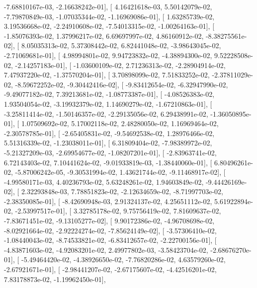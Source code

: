 \documentclass{article}
\begin{document}
         -7.68810167e-03,  -2.16638242e-01],
       [  4.16421618e-03,   5.50142079e-02,  -7.79870849e-03,
         -1.07035344e-02,  -1.16969086e-01],
       [  1.63285739e-02,   3.19536668e-02,  -2.24910608e-02,
         -7.54013315e-02,  -1.00264163e-01],
       [ -1.85076393e-02,   1.37996217e-02,   6.69697997e-02,
          4.86160912e-02,  -8.38275561e-02],
       [  8.05035313e-02,   5.37308442e-02,   6.82441048e-02,
         -3.98643045e-02,  -2.71069681e-01],
       [  4.98994801e-02,   9.94723832e-02,  -4.38894300e-02,
          9.52228508e-02,  -2.14257183e-01],
       [ -1.03600109e-02,   2.71236313e-02,  -2.28904914e-02,
          7.47937220e-02,  -1.37570204e-01],
       [  3.70898099e-02,   7.51833252e-02,  -2.37811029e-02,
         -8.59672252e-02,  -9.30442416e-02],
       [ -9.83412654e-02,  -6.32947990e-02,  -9.49077182e-02,
          7.39213681e-02,  -1.08773387e-01],
       [ -4.08526383e-02,   1.93504054e-02,  -3.19932379e-02,
          1.14690279e-02,  -1.67210863e-01],
       [ -3.25811414e-02,  -1.50146357e-02,  -2.29135056e-02,
          6.29438991e-02,  -1.36050895e-01],
       [  1.07509692e-02,   5.17002118e-02,   2.48280050e-02,
          1.16969464e-02,  -2.30578785e-01],
       [ -2.65405831e-02,  -9.54692538e-02,   1.28976466e-02,
          5.51316339e-02,  -1.23038011e-01],
       [  6.31809404e-02,  -7.98389972e-02,  -5.21327209e-03,
         -2.69954677e-02,  -1.08207201e-01],
       [ -2.83963741e-02,   6.72143403e-02,   7.10441624e-02,
         -9.01933819e-03,  -1.38440060e-01],
       [  6.80496261e-02,  -5.87006242e-05,  -9.30531994e-02,
          1.43621744e-02,  -9.11468917e-02],
       [ -4.99580171e-03,   4.40236793e-02,   5.63248261e-02,
          1.94603849e-02,  -9.44426169e-02],
       [  2.32293848e-03,   7.78851823e-02,  -2.12634659e-02,
         -8.71997703e-02,  -2.38350085e-01],
       [ -8.42690948e-03,   2.91324137e-02,   4.25651112e-02,
          5.61922894e-02,  -2.53997517e-01],
       [  3.32785178e-02,   9.75756419e-02,   7.81609637e-02,
         -7.83671451e-02,  -9.13105277e-02],
       [  9.90172386e-02,  -4.96708698e-02,  -8.02921664e-02,
         -2.92224274e-02,  -7.85624149e-02],
       [ -3.57306410e-02,  -1.08440043e-02,  -8.74533821e-02,
         -6.83412657e-02,  -2.22700156e-01],
       [ -4.83871603e-02,  -4.92083201e-02,   2.49977802e-03,
         -3.58423704e-02,  -2.68676270e-01],
       [ -5.49464420e-02,  -4.38926650e-02,  -7.76820286e-02,
          4.63579260e-02,  -2.67921671e-01],
       [ -2.98441207e-02,  -2.67175607e-02,  -4.42516201e-02,
          7.83178873e-02,  -1.19962450e-01],
\end{document}
